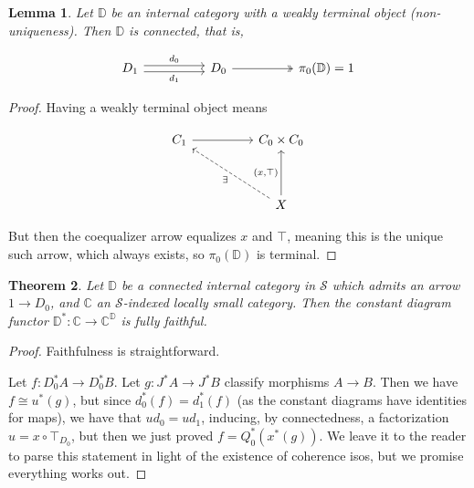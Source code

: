 \documentclass[10pt, oneside]{article}
\newtheorem{theorem}{Theorem}[section]
\newtheorem{lemma}[theorem]{Lemma}
\begin{document}
\begin{lemma}
    Let $\mathbb{D}$ be an internal category with a weakly terminal object (non-uniqueness). Then $\mathbb{D}$ is connected, that is,

    \[\begin{tikzcd}[ampersand replacement=\&]
	{D_1} \&\& {D_0} \&\& {\pi_0(\mathbb{D}) = 1}
	\arrow["{d_0}", shift left, from=1-1, to=1-3]
	\arrow["{d_1}"', shift right, from=1-1, to=1-3]
	\arrow[two heads, from=1-3, to=1-5]
\end{tikzcd}\]
\end{lemma}
\begin{proof}
    Having a weakly terminal object means

    \[\begin{tikzcd}[ampersand replacement=\&]
	{C_1} \&\& {C_0 \times C_0} \\
	\\
	\&\& X
	\arrow["{(x, \top)}", from=3-3, to=1-3]
	\arrow["\exists", dashed, from=3-3, to=1-1]
	\arrow[from=1-1, to=1-3]
\end{tikzcd}\]

 But then the coequalizer arrow equalizes $x$ and $\top$, meaning this is the unique such arrow, which always exists, so $\pi_0(\mathbb{D})$ is terminal.
\end{proof}

\begin{theorem}
    Let $\mathbb{D}$ be a connected internal category in $\mathcal{S}$ which admits an arrow $1 \to D_0$, and $\mathbb{C}$ an $\mathcal{S}$-indexed locally small category. Then the constant diagram functor $\mathbb{D}^\ast: \mathbb{C} \to \mathbb{C}^\mathbb{D}$ is fully faithful.
\end{theorem}
\begin{proof}
    Faithfulness is straightforward.

    Let $f: D_0^\ast A \to D_0^\ast B$. Let $g: J^\ast A \to J^\ast B$ classify morphisms $A \to B$. Then we have $f \cong u^\ast (g)$, but since $d_0^\ast(f) = d_1^\ast(f)$ (as the constant diagrams have identities for maps), we have that $u d_0 = u d_1$, inducing, by connectedness, a factorization $u = x \circ \top_{D_0}$, but then we just proved $f = Q_0^\ast (x^\ast (g) )$. We leave it to the reader to parse this statement in light of the existence of coherence isos, but we promise everything works out.
\end{proof}
\end{document}
